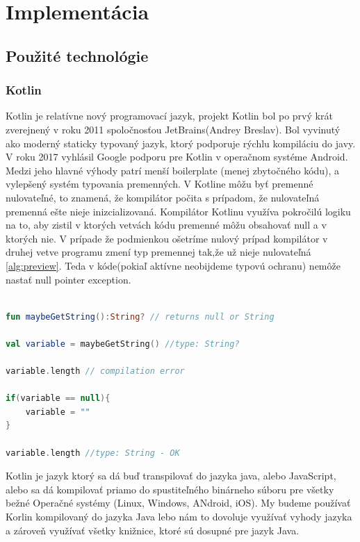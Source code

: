 \section{Implementácia} 


  

\subsection{Použité technológie} 

  

\subsubsection{Kotlin} 

Kotlin je relatívne nový programovací jazyk, projekt Kotlin bol po prvý krát zverejnený v roku 2011 spoločnosťou JetBrains(Andrey Breslav). Bol vyvinutý ako moderný staticky typovaný jazyk, ktorý podporuje rýchlu kompiláciu do javy. V roku 2017 vyhlásil Google podporu pre Kotlin v operačnom systéme Android.  
Medzi jeho hlavné výhody patrí menší boilerplate (menej zbytočného kódu), a vylepšený systém typovania premenných. V Kotline  môžu byť premenné nulovateľné, to znamená, že kompilátor počita s prípadom, že nulovateľná premenná ešte nieje inizcializovaná. Kompilátor Kotlinu využíva pokročilú logiku na to, aby zistil v ktorých vetvách kódu premenné môžu obsahovať null a v ktorých nie. V prípade že podmienkou ošetríme nulový prípad kompilátor v druhej vetve programu zmení typ premennej tak,že už nieje nulovateľná \ref{alg:preview}. Teda v kóde(pokiaľ aktívne neobijdeme typovú ochranu) nemôže nastať null pointer exception.



\begin{lstlisting}[float, caption={Ukážka funkcie typov v jazyku Kotlin},label={alg:preview},language=Kotlin]

fun maybeGetString():String? // returns null or String

val variable = maybeGetString() //type: String?

variable.length // compilation error

if(variable == null){
	variable = ""
}

variable.length //type: String - OK

\end{lstlisting}


Kotlin je jazyk ktorý sa dá buď transpilovať do jazyka java, alebo JavaScript, alebo sa dá kompilovať priamo do spustiteľného  binárneho súboru
pre všetky bežné Operačné systémy (Linux, Windows, ANdroid, iOS). My budeme používať Korlin kompilovaný do jazyka Java lebo nám to dovoluje využívať vyhody jazyka a zároveň využívať všetky knižnice, ktoré sú dosupné pre jazyk Java.


